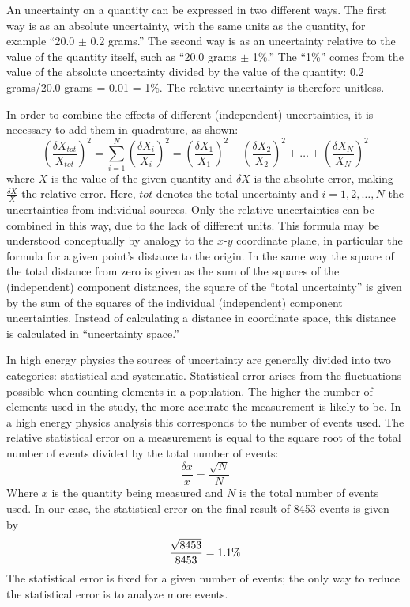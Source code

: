 An uncertainty on a quantity can be 
expressed in two different ways.  
The first way is as an absolute uncertainty, 
with the same units as the quantity, 
for example ``20.0 $\pm$ 0.2 grams.''  
The second way is as an uncertainty 
relative to the value of the quantity itself, 
such as ``20.0 grams $\pm$ 1\%.''  
The ``1\%'' comes from the value of the absolute 
uncertainty divided by the value of the quantity: 
0.2 grams/20.0 grams = 0.01 = 1\%. 
The relative uncertainty is therefore unitless.  


In order to combine the effects of 
different (independent) uncertainties, 
it is necessary to add them 
in quadrature, as shown:
\[
\left(\frac{\delta X_{tot}}{X_{tot}}\right)^2 
= \sum_{i=1}^{N} \left(\frac{\delta X_i}{X_i}\right)^2 
= \left(\frac{\delta X_1}{X_1}\right)^2 
+ \left(\frac{\delta X_2}{X_2}\right)^2 
+ \ldots
+ \left(\frac{\delta X_N}{X_N}\right)^2 
\]
where 
$X$ is the value of the given quantity and 
$\delta X$ is the absolute error, 
making $\frac{\delta X}{X}$ the relative error.  
Here, $tot$ denotes the total uncertainty 
and $i=1,2,\ldots ,N$ the uncertainties from 
individual sources.  
Only the relative uncertainties 
can be combined in this way, 
due to the lack of different units.  
This formula may be understood 
conceptually by analogy to the 
$x$-$y$ coordinate plane, in particular 
the formula for a given point's distance 
to the origin.  
In the same way the square of the total distance 
from zero is given as the sum of the squares 
of the (independent) component distances, 
the square of the ``total uncertainty'' 
is given by the sum of the squares of the 
individual (independent) component uncertainties.  
Instead of calculating a distance in %
coordinate space, 
this distance is calculated in 
``uncertainty space.''

In high energy physics the sources of uncertainty 
are generally divided into two categories: 
statistical and systematic.  
Statistical error arises from the fluctuations 
possible when counting elements in a population.  
The higher the number of elements used 
in the study, 
the more accurate the measurement is likely to be.  
In a high energy physics analysis 
this corresponds to the number of events used.  
The relative statistical error on a measurement 
is equal to the square root of the total number 
of events divided by the total number of events:
\[
\frac{\delta{}x}{x} = \frac{\sqrt{N}}{N}
\]
Where $x$ is the quantity being measured and 
$N$ is the total number of events used.  
In our case, the statistical error on the final 
result of 8453 events is given by 
\[
\frac{\sqrt{\nevents{}}}{\nevents{}} = 1.1\% %
\]
The statistical error is fixed for a given number 
of events; 
the only way to reduce the statistical error 
is to analyze more events.  

